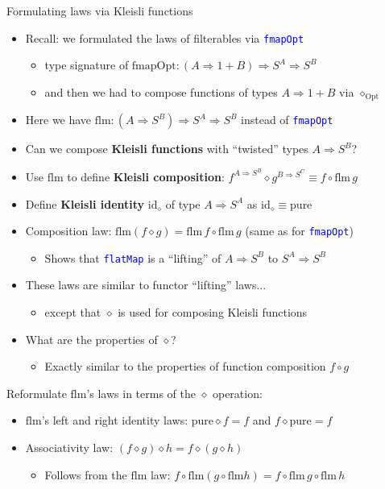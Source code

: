 \documentclass[english]{beamer}
\begin{document}
\begin{frame}{Formulating laws via Kleisli functions}
\begin{itemize}
\item Recall: we formulated the laws of filterables via \texttt{\textcolor{blue}{\footnotesize{}fmapOpt}} 
\begin{itemize}
\item type signature of $\text{fmapOpt}:\left(A\Rightarrow1+B\right)\Rightarrow S^{A}\Rightarrow S^{B}$
\item and then we had to compose functions of types $A\Rightarrow1+B$ via
$\diamond_{\text{Opt}}$
\end{itemize}
\item Here we have{\small{} $\text{flm}:\left(A\Rightarrow S^{B}\right)\Rightarrow S^{A}\Rightarrow S^{B}$}
instead of \texttt{\textcolor{blue}{\footnotesize{}fmapOpt}} 
\item Can we compose \textbf{Kleisli functions} with ``twisted'' types
$A\Rightarrow S^{B}$?
\item Use $\text{flm}$ to define \textbf{Kleisli composition}: $f^{A\Rightarrow S^{B}}\diamond g^{B\Rightarrow S^{C}}\equiv f\circ\text{flm}\,g$
\item Define \textbf{Kleisli identity} $\text{id}_{\diamond}$ of type $A\Rightarrow S^{A}$
as $\text{id}_{\diamond}\equiv\text{pure}$
\item Composition law: $\text{flm}\left(f\diamond g\right)=\text{flm}\,f\circ\text{flm}\,g$
(same as for \texttt{\textcolor{blue}{\footnotesize{}fmapOpt}})
\begin{itemize}
\item Shows that \texttt{\textcolor{blue}{\footnotesize{}flatMap}} is a
``lifting'' of $A\Rightarrow S^{B}$ to $S^{A}\Rightarrow S^{B}$
\end{itemize}
\item These laws are similar to functor ``lifting'' laws...
\begin{itemize}
\item except that $\diamond$ is used for composing Kleisli functions
\end{itemize}
\item What are the properties of $\diamond$?
\begin{itemize}
\item Exactly similar to the properties of function composition $f\circ g$
\end{itemize}
\end{itemize}
Reformulate $\text{flm}$'s laws in terms of the $\diamond$ operation:
\begin{itemize}
\item $\text{flm}$'s left and right identity laws: $\text{pure}\diamond f=f$
and $f\diamond\text{pure}=f$
\item Associativity law: $\left(f\diamond g\right)\diamond h=f\diamond\left(g\diamond h\right)$
\begin{itemize}
\item Follows from the $\text{flm}$ law: $f\circ\text{flm}\left(g\circ\text{flm}h\right)=f\circ\text{flm}\,g\circ\text{flm}\,h$
\end{itemize}
\end{itemize}
\end{frame}
\end{document}
